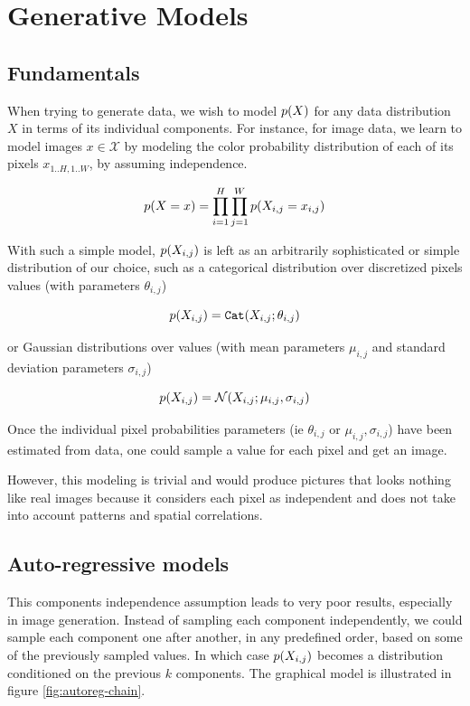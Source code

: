 \section{Generative Models}
\subsection{Fundamentals}
When trying to generate data, we wish to model $p(X)$ for any data distribution $X$ in terms of its individual components. For instance, for image data, we learn to model images $x \in \mathcal{X}$ by modeling the color probability distribution of each of its pixels $x_{1..H, 1..W}$, by assuming independence.

\begin{equation}
\label{gen_model1}
    p(X=x) = \prod_{i=1}^H \prod_{j=1}^W p(X_{i, j}=x_{i, j})
\end{equation}

With such a simple model, $p(X_{i, j})$ is left as an arbitrarily sophisticated or simple distribution of our choice, such as a categorical distribution over discretized pixels values (with parameters $\theta_{i,j}$)

\begin{equation}
    p(X_{i,j}) = \texttt{Cat}(X_{i,j}; \theta_{i,j})
\end{equation}

or Gaussian distributions over values (with mean parameters $\mu_{i,j}$ and standard deviation parameters $\sigma_{i,j}$)

\begin{equation}
    p(X_{i,j}) = \mathcal{N}(X_{i,j}; \mu_{i,j}, \sigma_{i,j})    
\end{equation}


Once the individual pixel probabilities parameters (ie $\theta_{i,j}$ or $\mu_{i,j}, \sigma_{i, j}$) have been estimated from data, one could sample a value for each pixel and get an image.

However, this modeling is trivial and would produce pictures that looks nothing like real images because it considers each pixel as independent and does not take into account patterns and spatial correlations. 

\subsection{Auto-regressive models}

This components independence assumption leads to very poor results, especially in image generation. Instead of sampling each component independently, we could sample each component one after another, in any predefined order, based on some of the previously sampled values. In which case $p(X_{i,j})$ becomes a distribution conditioned on the previous $k$ components. The graphical model is illustrated in figure \ref{fig:autoreg-chain}.

